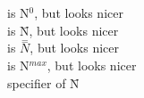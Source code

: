  is N$^0$, but looks nicer\\
 is \={N}, but looks nicer\\
 is $\stackrel{=}{N}$, but looks nicer\\
 is N$^{max}$, but looks nicer\\
 specifier of \={N}